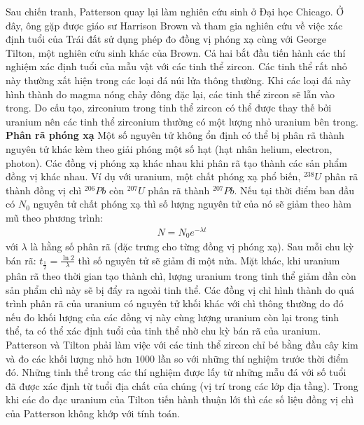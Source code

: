 \begin{multicols}{2}
\begin{figure}[H]
		\vspace*{-10pt}
	\end{figure} 
	Sau chiến tranh, Patterson quay lại làm nghiên cứu sinh ở Đại học Chicago. Ở đây, ông gặp được giáo sư Harrison Brown và tham gia nghiên cứu về việc xác định tuổi của Trái đất sử dụng phép đo đồng vị phóng xạ cùng với George Tilton, một nghiên cứu sinh khác của Brown. Cả hai bắt đầu tiến hành các thí nghiệm xác định tuổi của mẫu vật với các tinh thể zircon. Các tinh thể rất nhỏ này thường xất hiện trong các loại đá núi lửa thông thường. Khi các loại đá này hình thành do magma nóng chảy đông đặc lại, các tinh thể zircon sẽ lẫn vào trong. Do cấu tạo, zirconium trong tinh thể zircon có thể được thay thế bởi uranium nên các tinh thể zirconium thường có một lượng nhỏ uranium bên trong.
	\vskip 0.05cm
	\textbf{\color{timhieukhoahoc}Phân rã phóng xạ}
	\vskip 0.05cm
	Một số nguyên tử không ổn định có thể bị phân rã thành nguyên tử khác kèm theo giải phóng một số hạt (hạt nhân helium, electron, photon). Các đồng vị phóng xạ khác nhau khi phân rã tạo thành các sản phẩm đồng vị khác nhau. Ví dụ với uranium, một chất phóng xạ phổ biến, $^{238}{U}$ phân rã thành đồng vị chì $^{206}{Pb}$ còn $^{207}{U}$ phân rã thành $^{207}{Pb}$.
	\vskip 0.05cm
	Nếu tại thời điểm ban đầu có $N_0$ nguyên tử chất phóng xạ thì số lượng nguyên tử của nó sẽ giảm theo hàm mũ theo phương trình:
	\begin{align*}
		N = N_0 e^{-\lambda t}
	\end{align*}
	với $\lambda$ là hằng số phân rã (đặc trưng cho từng đồng vị phóng xạ). Sau mỗi chu kỳ bán rã: $t_{\frac{1}{2}} = \frac{\ln 2}{\lambda}$ thì số nguyên tử sẽ giảm đi một nửa.
	\vskip 0.05cm
	Mặt khác, khi uranium phân rã theo thời gian tạo thành chì, lượng uranium trong tinh thể giảm dần còn sản phẩm chì này sẽ bị đẩy ra ngoài tinh thể. Các đồng vị chì hình thành do quá trình phân rã của uranium có nguyên tử khối khác với chì thông thường do đó nếu đo khối lượng của các đồng vị này cùng lượng uranium còn lại trong tinh thể, ta có thể xác định tuổi của tinh thể nhờ chu kỳ bán rã của uranium.
	\vskip 0.05cm
	Patterson và Tilton phải làm việc với các tinh thể zircon chỉ bé bằng đầu cây kim và đo các khối lượng nhỏ hơn $1000$ lần so với những thí nghiệm trước thời điểm đó. Những tinh thể trong các thí nghiệm được lấy từ những mẫu đá với số tuổi đã được xác định từ tuổi địa chất của chúng (vị trí trong các lớp địa tầng). Trong khi các đo đạc uranium của Tilton tiến hành thuận lới thì các số liệu đồng vị chì của Patterson không khớp với tính toán.
	\vskip 0.1cm

\end{multicols}
